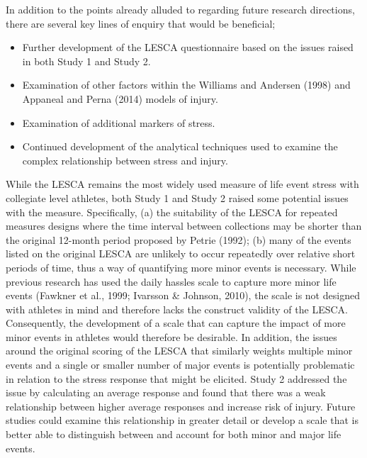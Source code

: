 \documentclass[man,floatsintext]{apa6}
\providecommand{\tightlist}{%
  \setlength{\itemsep}{0pt}\setlength{\parskip}{0pt}}
\begin{document}
In addition to the points already alluded to regarding future research directions, there are several key lines of enquiry that would be beneficial;

\begin{itemize}
\tightlist
\item
  Further development of the LESCA questionnaire based on the issues raised in both Study 1 and Study 2.
\item
  Examination of other factors within the Williams and Andersen (1998) and Appaneal and Perna (2014) models of injury.
\item
  Examination of additional markers of stress.
\item
  Continued development of the analytical techniques used to examine the complex relationship between stress and injury.
\end{itemize}

While the LESCA remains the most widely used measure of life event stress with collegiate level athletes, both Study 1 and Study 2 raised some potential issues with the measure.
Specifically, (a) the suitability of the LESCA for repeated measures designs where the time interval between collections may be shorter than the original 12-month period proposed by Petrie (1992);
(b) many of the events listed on the original LESCA are unlikely to occur repeatedly over relative short periods of time, thus a way of quantifying more minor events is necessary.
While previous research has used the daily hassles scale to capture more minor life events (Fawkner et al., 1999; Ivarsson \& Johnson, 2010), the scale is not designed with athletes in mind and therefore lacks the construct validity of the LESCA.
Consequently, the development of a scale that can capture the impact of more minor events in athletes would therefore be desirable.
In addition, the issues around the original scoring of the LESCA that similarly weights multiple minor events and a single or smaller number of major events is potentially problematic in relation to the stress response that might be elicited.
Study 2 addressed the issue by calculating an average response and found that there was a weak relationship between higher average responses and increase risk of injury.
Future studies could examine this relationship in greater detail or develop a scale that is better able to distinguish between and account for both minor and major life events.
\end{document}
